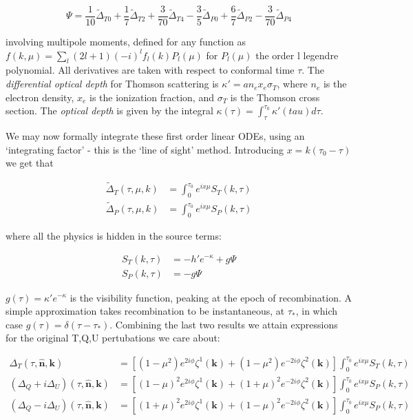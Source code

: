 \documentclass[a4paper,11pt]{article}
\renewcommand{\v}[1]{\mathbf{#1}}
\newcommand{\unit}[1]{\hat{\v{#1}}}
\begin{document}
\begin{equation}
\Psi = \frac{1}{10}\tilde{\Delta}_{T0} + \frac{1}{7}\tilde{\Delta}_{T2} + \frac{3}{70}\tilde{\Delta}_{T4} - \frac{3}{5}\tilde{\Delta}_{P0} + \frac{6}{7}\tilde{\Delta}_{P2} - \frac{3}{70}\tilde{\Delta}_{P4}
\end{equation}


involving multipole moments, defined for any function as $f(k, \mu) = \sum_l (2l+1)(-i)^lf_l(k)P_l(\mu)$ for $P_l(\mu)$ the order l legendre polynomial. All derivatives are taken with respect to conformal time $\tau$. The \textit{differential optical depth} for Thomson scattering is $\kappa'=an_ex_e\sigma_T$, where $n_e$ is the electron density, $x_e$ is the ionization fraction, and $\sigma_T$ is the Thomson cross section. The \textit{optical depth} is given by the integral $\kappa(\tau) = \int_\tau^{\tau_0} \kappa'(tau)d\tau$. 


We may now formally integrate these first order linear ODEs, using an `integrating factor' - this is the `line of sight' method. Introducing $x=k(\tau_0-\tau)$ we get that 

\begin{align}
\tilde{\Delta}_T(\tau,\mu,k) &= \int_0^{\tau_0} e^{ix\mu}S_T(k,\tau)\\
\tilde{\Delta}_P(\tau,\mu,k) &= \int_0^{\tau_0} e^{ix\mu}S_P(k,\tau)
\end{align}

where all the physics is hidden in the source terms:

\begin{align}
S_T(k,\tau) &= -h'e^{-\kappa}+g\Psi\\
S_P(k,\tau) &= -g\Psi
\end{align}

$g(\tau) = \kappa'e^{-\kappa}$ is the visibility function, peaking at the epoch of recombination. A simple approximation takes recombination to be instantaneous, at $\tau_*$, in which case $g(\tau) = \delta(\tau-\tau_*)$. Combining the last two results we attain expressions for the original T,Q,U pertubations we care about:



\begin{align}
\Delta_T(\tau,\unit{n},\v{k}) &= [(1-\mu^2) e^{2i\phi} \zeta^1(\v{k})+(1-\mu^2) e^{-2i\phi} \zeta^2(\v{k})]\int_0^{\tau_0} e^{ix\mu}S_T(k,\tau)\\
(\Delta_Q+i\Delta_U)(\tau,\unit{n},\v{k}) &=[(1-\mu)^2 e^{2i\phi} \zeta^1(\v{k})+(1+\mu)^2 e^{-2i\phi} \zeta^2(\v{k})]\int_0^{\tau_0} e^{ix\mu}S_P(k,\tau)\\
(\Delta_Q-i\Delta_U)(\tau,\unit{n},\v{k}) &=[(1+\mu)^2 e^{2i\phi} \zeta^1(\v{k})+(1-\mu)^2 e^{-2i\phi} \zeta^2(\v{k})]\int_0^{\tau_0} e^{ix\mu}S_P(k,\tau)
\end{align}
\end{document}
